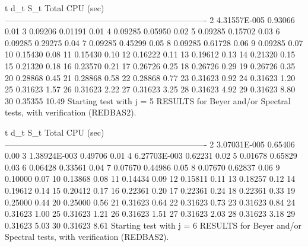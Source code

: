     t           d_t           S_t      Total CPU (sec)
 -------------------------------------------------------------------------
    2    4.31557E-005       0.93066        0.01
    3         0.09206       0.01191        0.01
    4         0.09285       0.05950        0.02
    5         0.09285       0.15702        0.03
    6         0.09285       0.29275        0.04
    7         0.09285       0.45299        0.05
    8         0.09285       0.61728        0.06
    9         0.09285                      0.07
   10         0.15430                      0.08
   11         0.15430                      0.10
   12         0.16222                      0.11
   13         0.19612                      0.13
   14         0.21320                      0.15
   15         0.21320                      0.18
   16         0.23570                      0.21
   17         0.26726                      0.25
   18         0.26726                      0.29
   19         0.26726                      0.35
   20         0.28868                      0.45
   21         0.28868                      0.58
   22         0.28868                      0.77
   23         0.31623                      0.92
   24         0.31623                      1.20
   25         0.31623                      1.57
   26         0.31623                      2.22
   27         0.31623                      3.25
   28         0.31623                      4.92
   29         0.31623                      8.80
   30         0.35355                     10.49
Starting test with j =  5
RESULTS for Beyer and/or Spectral tests, with verification (REDBAS2).


    t           d_t           S_t      Total CPU (sec)
 -------------------------------------------------------------------------
    2    3.07031E-005       0.65406        0.00
    3    1.38924E-003       0.49706        0.01
    4    6.27703E-003       0.62231        0.02
    5         0.01678       0.65829        0.03
    6         0.06428       0.33561        0.04
    7         0.07670       0.44986        0.05
    8         0.07670       0.62837        0.06
    9         0.10000                      0.07
   10         0.13868                      0.08
   11         0.14434                      0.09
   12         0.15811                      0.11
   13         0.18257                      0.12
   14         0.19612                      0.14
   15         0.20412                      0.17
   16         0.22361                      0.20
   17         0.22361                      0.24
   18         0.22361                      0.33
   19         0.25000                      0.44
   20         0.25000                      0.56
   21         0.31623                      0.64
   22         0.31623                      0.73
   23         0.31623                      0.84
   24         0.31623                      1.00
   25         0.31623                      1.21
   26         0.31623                      1.51
   27         0.31623                      2.03
   28         0.31623                      3.18
   29         0.31623                      5.03
   30         0.31623                      8.61
Starting test with j =  6
RESULTS for Beyer and/or Spectral tests, with verification (REDBAS2).


